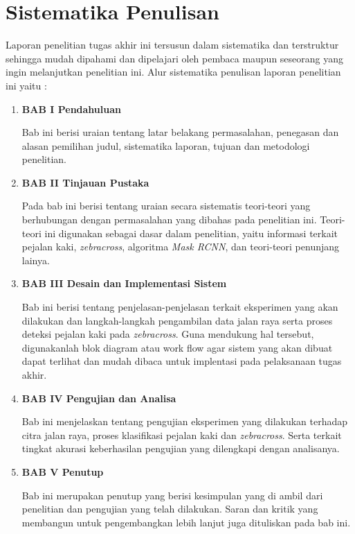 \section{Sistematika Penulisan}
\label{sec:sistematikapenulisan}

Laporan penelitian tugas akhir ini tersusun dalam sistematika dan terstruktur sehingga mudah dipahami dan dipelajari oleh pembaca maupun seseorang yang ingin melanjutkan penelitian ini. Alur sistematika penulisan laporan penelitian ini yaitu :

\begin{enumerate}[nolistsep]

  \item \textbf{BAB I Pendahuluan}

  Bab ini berisi uraian tentang latar belakang permasalahan, penegasan dan alasan pemilihan judul, sistematika laporan, tujuan dan metodologi penelitian.

  \vspace{2ex}

  \item \textbf{BAB II Tinjauan Pustaka}

  Pada bab ini berisi tentang uraian secara sistematis teori-teori yang berhubungan dengan permasalahan yang dibahas pada penelitian ini. Teori-teori ini digunakan sebagai dasar dalam penelitian, yaitu informasi terkait pejalan kaki, \textit{zebracross}, algoritma \textit{Mask RCNN}, dan teori-teori penunjang lainya.

  \vspace{2ex}

  \item \textbf{BAB III Desain dan Implementasi Sistem}

  Bab ini berisi tentang penjelasan-penjelasan terkait eksperimen yang akan dilakukan dan langkah-langkah pengambilan data jalan raya serta proses deteksi pejalan kaki pada \textit{zebracross}. Guna mendukung hal tersebut, digunakanlah blok diagram atau work flow agar sistem yang akan dibuat dapat terlihat dan mudah dibaca untuk implentasi pada pelaksanaan tugas akhir.

  \vspace{2ex}

  \item \textbf{BAB IV Pengujian dan Analisa}

  Bab ini menjelaskan tentang pengujian eksperimen yang dilakukan terhadap citra jalan raya, proses klasifikasi pejalan kaki dan \textit{zebracross}. Serta terkait tingkat akurasi keberhasilan pengujian yang dilengkapi dengan analisanya.

  \vspace{2ex}

  \item \textbf{BAB V Penutup}

  Bab ini merupakan penutup yang berisi kesimpulan yang di ambil dari penelitian dan pengujian yang telah dilakukan. Saran dan kritik yang membangun untuk pengembangkan lebih lanjut juga dituliskan pada bab ini.

\end{enumerate}

